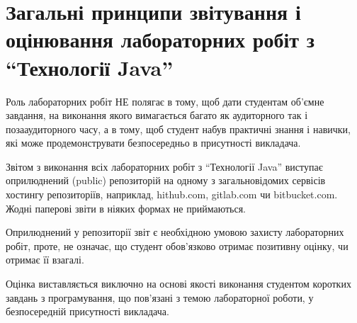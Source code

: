 \section{Загальні принципи звітування і оцінювання лабораторних робіт з ``Технології Java''}

Роль лабораторних робіт НЕ полягає в тому, щоб дати студентам об’ємне завдання, на виконання якого вимагається багато як аудиторного так і позааудиторного часу, а в тому, щоб студент набув практичні знання і навички, які може продемонструвати безпосередньо в присутності викладача. 

Звітом з виконання всіх лабораторних робіт з ``Технології Java'' виступає оприлюднений (public) репозиторій на одному з загальновідомих сервісів хостингу репозиторіїв, наприклад, hithub.com, gitlab.com чи bitbucket.com. Жодні паперові звіти в ніяких формах не приймаються. 

Оприлюднений у репозиторії звіт є необхідною умовою захисту лабораторних робіт, проте, не означає, що студент обов’язково отримає позитивну оцінку, чи отримає її взагалі.

Оцінка виставляється виключно на основі якості виконання студентом коротких завдань з програмування, що пов’язані з темою лабораторної роботи, у безпосередній присутності викладача.
